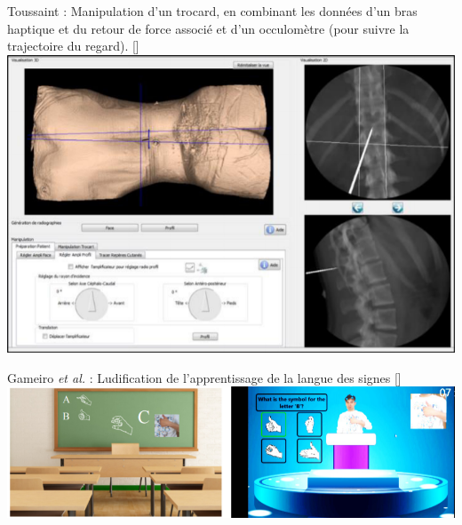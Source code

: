 \documentclass[svgnames]{beamer}
\newcommand{\mycite}[1]{[\textit{\cite{#1}}]}
\begin{document}
	\begin{frame}{\secname}
		Toussaint : Manipulation d'un trocard, en combinant les données d'un bras haptique et du retour de force associé et d'un occulomètre (pour suivre la trajectoire du regard). \mycite{BMT_2015}\\
		\centering
		\includegraphics[scale=0.4]{img/eiah_toussaint.png}
	\end{frame}
	
	\begin{frame}{\secname}
		 Gameiro \textit{et al.} : Ludification de l'apprentissage de la langue des signes \mycite{Gameiro2014KST}\\
		\centering
		\includegraphics[scale=0.4]{img/eiah_gameiro.png}
	\end{frame}
	
\end{document}
